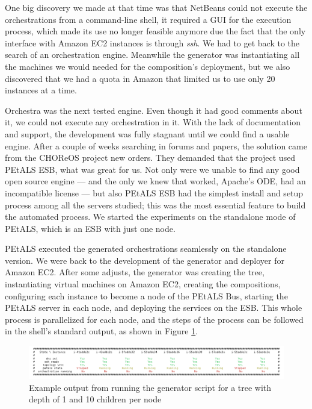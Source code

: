 One big discovery we made at that time was that NetBeans could not execute the orchestrations from a command-line shell, it required a GUI for the execution process, which made its use no longer feasible anymore due the fact that the only interface with Amazon EC2 instances is through \emph{ssh}. We had to get back to the search of an orchestration engine. Meanwhile the generator was instantiating all the machines we would needed for the composition's deployment, but we also discovered that we had a quota in Amazon that limited us to use only 20 instances at a time.

Orchestra was the next tested engine. Even though it had good comments about it, we could not execute any orchestration in it. With the lack of documentation and support, the development was fully stagnant until we could find a usable engine. After a couple of weeks searching in forums and papers, the solution came from the CHOReOS project new orders. They demanded that the project used PEtALS ESB, what was great for us. Not only were we unable to find any good open source engine --- and the only we knew that worked, Apache's ODE, had an incompatible license --- but also PEtALS ESB had the simplest install and setup process among all the servers studied; this was the most essential feature to build the automated process. We started the experiments on the standalone mode of PEtALS, which is an ESB with just one node.

PEtALS executed the generated orchestrations seamlessly on the standalone version. We were back to the development of the generator and deployer for Amazon EC2. After some adjusts, the generator was creating the tree, instantiating virtual machines on Amazon EC2, creating the compositions, configuring each instance to become a node of the PEtALS Bus, starting the PEtALS server in each node, and deploying the services on the ESB. This whole process is parallelized for each node, and the steps of the process can be followed in the shell's standard output, as shown in Figure \ref{generation-output}.

\begin{figure}[htb]
	\centering
	\includegraphics[trim= 10mm 0mm 10mm 0mm, clip, width=\textwidth]{images/generation-output}
	\caption{Example output from running the generator script for a tree with depth of 1 and 10 children per node}
	\label{generation-output}
\end{figure}

